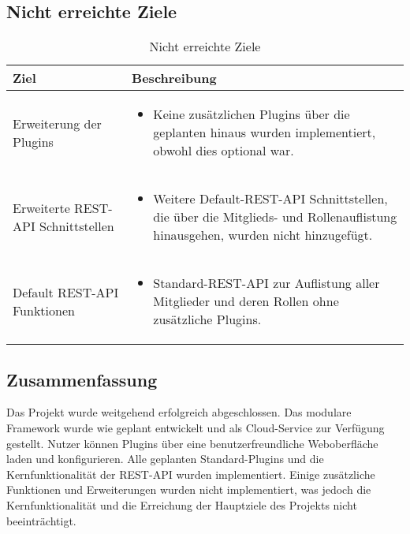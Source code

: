 \subsection*{Nicht erreichte Ziele}

\begin{table}[!h]
    \centering
    \begin{tabular}{lp{10cm}}
        \toprule
        \textbf{Ziel} & \textbf{Beschreibung} \\
        \midrule
        Erweiterung der Plugins &
        \begin{itemize}
            \item Keine zusätzlichen Plugins über die geplanten hinaus wurden implementiert, obwohl dies optional war.
        \end{itemize} \\
        \midrule
        Erweiterte REST-API Schnittstellen &
        \begin{itemize}
            \item Weitere Default-REST-API Schnittstellen, die über die Mitglieds- und Rollenauflistung hinausgehen, wurden nicht hinzugefügt.
        \end{itemize} \\
        \midrule
        Default REST-API Funktionen &
        \begin{itemize}
            \item Standard-REST-API zur Auflistung aller Mitglieder und deren Rollen ohne zusätzliche Plugins.
        \end{itemize} \\
        \bottomrule
    \end{tabular}
    \caption{Nicht erreichte Ziele}
    \label{tab:nicht_erreichte_ziele}
\end{table}

\subsection*{Zusammenfassung}

Das Projekt wurde weitgehend erfolgreich abgeschlossen. Das modulare Framework wurde wie geplant entwickelt und als Cloud-Service zur Verfügung gestellt. Nutzer können Plugins über eine benutzerfreundliche Weboberfläche laden und konfigurieren. Alle geplanten Standard-Plugins und die Kernfunktionalität der REST-API wurden implementiert. Einige zusätzliche Funktionen und Erweiterungen wurden nicht implementiert, was jedoch die Kernfunktionalität und die Erreichung der Hauptziele des Projekts nicht beeinträchtigt.

